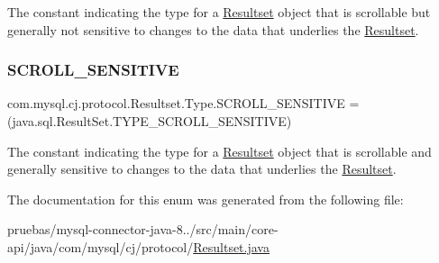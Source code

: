 The constant indicating the type for a {\ttfamily \mbox{\hyperlink{interfacecom_1_1mysql_1_1cj_1_1protocol_1_1_resultset}{Resultset}}} object that is scrollable but generally not sensitive to changes to the data that underlies the {\ttfamily \mbox{\hyperlink{interfacecom_1_1mysql_1_1cj_1_1protocol_1_1_resultset}{Resultset}}}. \mbox{\label{enumcom_1_1mysql_1_1cj_1_1protocol_1_1_resultset_1_1_type_a61adf90ea3124efe223bb2b80b921233}} 
\subsubsection{\texorpdfstring{S\+C\+R\+O\+L\+L\+\_\+\+S\+E\+N\+S\+I\+T\+I\+VE}{SCROLL\_SENSITIVE}}
{\footnotesize\ttfamily com.\+mysql.\+cj.\+protocol.\+Resultset.\+Type.\+S\+C\+R\+O\+L\+L\+\_\+\+S\+E\+N\+S\+I\+T\+I\+VE =(java.\+sql.\+Result\+Set.\+T\+Y\+P\+E\+\_\+\+S\+C\+R\+O\+L\+L\+\_\+\+S\+E\+N\+S\+I\+T\+I\+VE)}

The constant indicating the type for a {\ttfamily \mbox{\hyperlink{interfacecom_1_1mysql_1_1cj_1_1protocol_1_1_resultset}{Resultset}}} object that is scrollable and generally sensitive to changes to the data that underlies the {\ttfamily \mbox{\hyperlink{interfacecom_1_1mysql_1_1cj_1_1protocol_1_1_resultset}{Resultset}}}. 

The documentation for this enum was generated from the following file\+:\begin{DoxyCompactItemize}
\item 
pruebas/mysql-\/connector-\/java-\/8../src/main/core-\/api/java/com/mysql/cj/protocol/\mbox{\hyperlink{_resultset_8java}{Resultset.\+java}}\end{DoxyCompactItemize}
